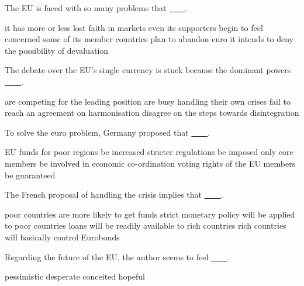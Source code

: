 \item The EU is faced with so many problems that \uline{~~~~}.
\begin{tasks}
	\task it has more or less lost faith in markets
	\task even its supporters begin to feel concerned
	\task some of its member countries plan to abandon euro
	\task it intends to deny the possibility of devaluation
\end{tasks}
\item The debate over the EU's single currency is stuck because the dominant powers \uline{~~~~}.
\begin{tasks}
	\task are competing for the leading position
	\task are busy handling their own crises
	\task fail to reach an agreement on harmonisation
	\task disagree on the steps towards disintegration
\end{tasks}
\item To solve the euro problem, Germany proposed that \uline{~~~~}.
\begin{tasks}
	\task EU funds for poor regions be increased
	\task stricter regulations be imposed
	\task only core members be involved in economic co-ordination
	\task voting rights of the EU members be guaranteed
\end{tasks}
\item The French proposal of handling the crisis implies that \uline{~~~~}.
\begin{tasks}
	\task poor countries are more likely to get funds
	\task strict monetary policy will be applied to poor countries
	\task loans will be readily available to rich countries
	\task rich countries will basically control Eurobonds
\end{tasks}
\item Regarding the future of the EU, the author seems to feel \uline{~~~~}.
\begin{tasks}
	\task pessimistic
	\task desperate
	\task conceited
	\task hopeful
\end{tasks}
